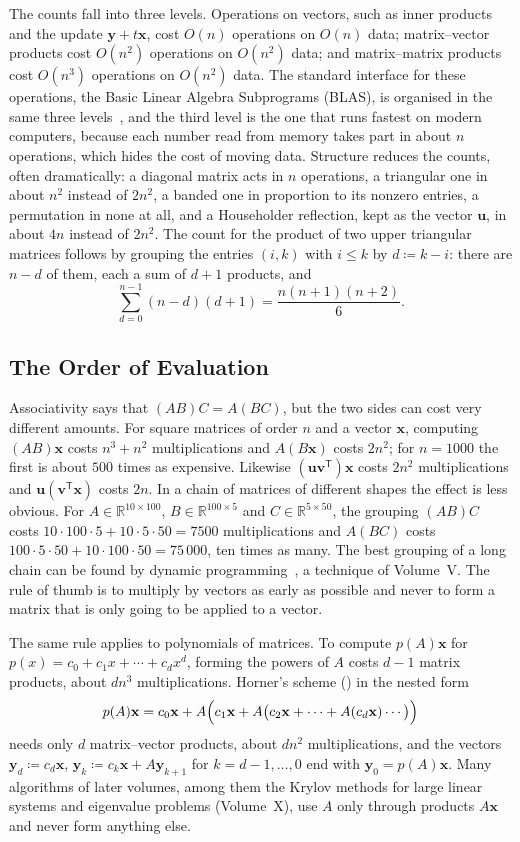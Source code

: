 The counts fall into three levels. Operations on vectors, such as inner products and the update $\mathbf y+t\mathbf x$, cost $O(n)$ operations on $O(n)$ data; matrix--vector products cost $O(n^2)$ operations on $O(n^2)$ data; and matrix--matrix products cost $O(n^3)$ operations on $O(n^2)$ data. The standard interface for these operations, the Basic Linear Algebra Subprograms (BLAS), is organised in the same three levels~\cite{dongarra1990}, and the third level is the one that runs fastest on modern computers, because each number read from memory takes part in about $n$ operations, which hides the cost of moving data. Structure reduces the counts, often dramatically: a diagonal matrix acts in $n$ operations, a triangular one in about $n^2$ instead of $2n^2$, a banded one in proportion to its nonzero entries, a permutation in none at all, and a Householder reflection, kept as the vector $\mathbf u$, in about $4n$ instead of $2n^2$. The count for the product of two upper triangular matrices follows by grouping the entries $(i,k)$ with $i\le k$ by $d\coloneqq k-i$: there are $n-d$ of them, each a sum of $d+1$ products, and
\[
\sum_{d=0}^{n-1}(n-d)(d+1)=\frac{n(n+1)(n+2)}6 .
\]

\subsection{The Order of Evaluation}

Associativity says that $(AB)C=A(BC)$, but the two sides can cost very different amounts. For square matrices of order $n$ and a vector $\mathbf x$, computing $(AB)\mathbf x$ costs $n^3+n^2$ multiplications and $A(B\mathbf x)$ costs $2n^2$; for $n=1000$ the first is about $500$ times as expensive. Likewise $(\mathbf u\mathbf v^{\mathsf T})\mathbf x$ costs $2n^2$ multiplications and $\mathbf u(\mathbf v^{\mathsf T}\mathbf x)$ costs $2n$. In a chain of matrices of different shapes the effect is less obvious. For $A\in\mathbb R^{10\times100}$, $B\in\mathbb R^{100\times5}$ and $C\in\mathbb R^{5\times50}$, the grouping $(AB)C$ costs $10\cdot100\cdot5+10\cdot5\cdot50=7500$ multiplications and $A(BC)$ costs $100\cdot5\cdot50+10\cdot100\cdot50=75\,000$, ten times as many. The best grouping of a long chain can be found by dynamic programming~\cite[Sect.~14.2]{cormen2022}, a technique of Volume~V. The rule of thumb is to multiply by vectors as early as possible and never to form a matrix that is only going to be applied to a vector.

The same rule applies to polynomials of matrices. To compute $p(A)\mathbf x$ for $p(x)=c_0+c_1x+\cdots+c_dx^d$, forming the powers of $A$ costs $d-1$ matrix products, about $dn^3$ multiplications. Horner's scheme () in the nested form
\[
p(A)\mathbf x=c_0\mathbf x+A\Bigl(c_1\mathbf x+A\bigl(c_2\mathbf x+\cdots+A(c_d\mathbf x)\cdots\bigr)\Bigr)
\]
needs only $d$ matrix--vector products, about $dn^2$ multiplications, and the vectors $\mathbf y_d\coloneqq c_d\mathbf x$, $\mathbf y_k\coloneqq c_k\mathbf x+A\mathbf y_{k+1}$ for $k=d-1,\ldots,0$ end with $\mathbf y_0=p(A)\mathbf x$. Many algorithms of later volumes, among them the Krylov methods for large linear systems and eigenvalue problems (Volume~X), use $A$ only through products $A\mathbf x$ and never form anything else.

